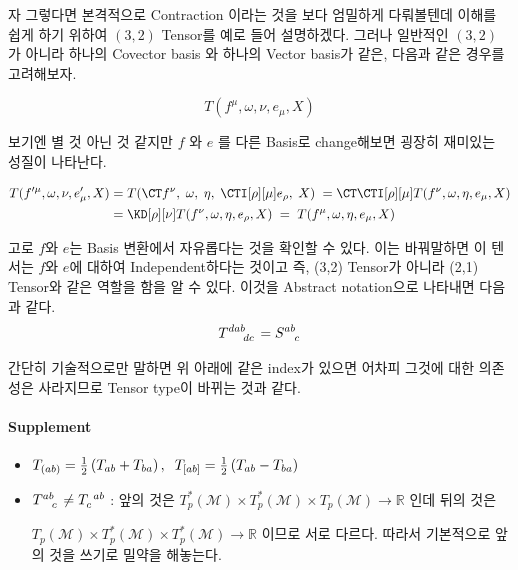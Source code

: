 \documentclass[final]{IEEEphot} %
\numberwithin{equation}{section} %
\numberwithin{figure}{section} %
\numberwithin{table}{section} %
\theoremstyle{plain}
\newcommand{\Com}{,\Hs}
\newcommand{\Hs}{\hspace{0.1cm}}
\newcommand{\HS}{\hspace{0.5cm}}
\newcommand{\VS}{\vspace{0.3cm}}
\newcommand{\BKS}[1]{\left( #1 \right)}
\newcommand{\Tangent}{T_p (\Manifold)}
\newcommand{\Cotangent}{T^{*}_p (\Manifold)}
\newcommand{\Manifold}{\mathcal{M}}
\begin{document}
\HS 자 그렇다면 본격적으로 Contraction 이라는 것을 보다 엄밀하게 다뤄볼텐데 이해를 쉽게 하기 위하여 $(3,2)$ Tensor를 예로 들어 설명하겠다. 그러나 일반적인 $(3,2)$ 가 아니라 하나의 Covector basis 와 하나의 Vector basis가 같은, 다음과 같은 경우를 고려해보자.

\begin{equation*}
 T(f^{\mu},\omega,\nu,e_{\mu},X)
\end{equation*}

보기엔 별 것 아닌 것 같지만 $f$ 와 $e$ 를 다른 Basis로 change해보면 굉장히 재미있는 성질이 나타난다.

\begin{align}
\begin{split}
 T(f'^{\mu},\omega,\nu,e'_{\mu},X) &= T(\CT f^{\nu}\Com \omega\Com \eta\Com \CTI[\rho][\mu]e_\rho\Com X)\Hs = \CT \CTI[\rho][\mu] T(f^\nu, \omega, \eta, e_\mu, X) \\
 & = \KD[\rho][\nu] T(f^\nu, \omega,\eta,e_\rho,X)\Hs = \Hs T(f^\mu,\omega,\eta,e_\mu,X)
\end{split}
\end{align}

\VS

고로 $f$와 $e$는 Basis 변환에서 자유롭다는 것을 확인할 수 있다. 이는 바꿔말하면 이 텐서는 $f$와 $e$에 대하여 Independent하다는 것이고 즉, (3,2) Tensor가 아니라
(2,1) Tensor와 같은 역할을 함을 알 수 있다. 이것을 Abstract notation\footnotemark 으로 나타내면 다음과 같다.
\begin{equation}
 \tensor{T}{^d ^a ^b _d _c} = \tensor{S}{^a ^b _c }
\end{equation}

간단히 기술적으로만 말하면 위 아래에 같은 index가 있으면 어차피 그것에 대한 의존성은 사라지므로 Tensor type이 바뀌는 것과 같다.

\paragraph{ Supplement}

\begin{itemize}
 \item $T_{(ab)} = \frac{1}{2} \BKS{T_{ab} + T_{ba}}\Com\Hs T_{[ab]} = \frac{1}{2}\BKS{T_{ab} - T_{ba}  }$
 \item $\tensor{T}{^a^b_c} \neq \tensor{T}{_c ^a ^b}$ : 앞의 것은 $\Cotangent\times\Cotangent\times\Tangent \rightarrow \mathbb{R}$ 인데 뒤의 것은 
 
 $\Tangent\times\Cotangent\times\Cotangent\rightarrow\mathbb{R}$ 이므로 서로 다르다. 따라서 기본적으로 앞의 것을 쓰기로 밀약을 해놓는다.
\end{itemize}
\end{document}
